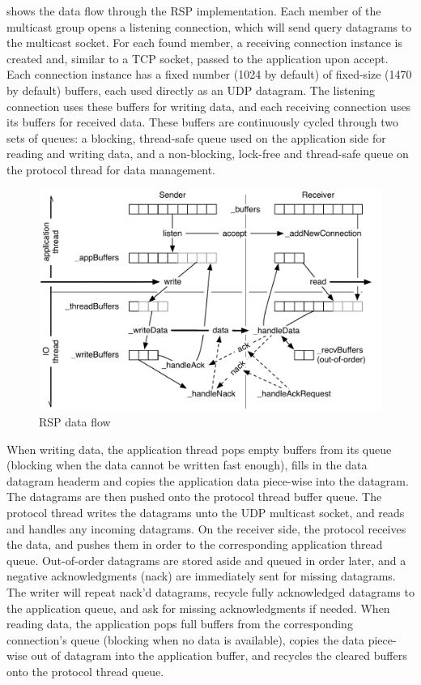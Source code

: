  shows the data flow through the RSP implementation. Each member of the multicast group opens a listening connection, which will send query datagrams to the multicast socket. For each found member, a receiving connection instance is created and, similar to a TCP socket, passed to the application upon \textsf{accept}. Each connection instance has a fixed number (1024 by default) of fixed-size (1470 by default) buffers, each used directly as an UDP datagram. The listening connection uses these buffers for writing data, and each receiving connection uses its buffers for received data. These buffers are continuously cycled through two sets of queues: a blocking, thread-safe queue used on the application side for reading and writing data, and a non-blocking, lock-free and thread-safe queue on the protocol thread for data management.

\begin{figure}[h!t]\center
  \includegraphics[width=\textwidth]{images/rspPackets.pdf}
  {\caption{\label{fRSP}RSP data flow}}
\end{figure}

When writing data, the application thread pops empty buffers from its queue
(blocking when the data cannot be written fast enough), fills in the
\textsf{data} datagram headerm and copies the application data piece-wise into
the datagram. The datagrams are then pushed onto the protocol thread buffer
queue. The protocol thread writes the datagrams unto the UDP multicast socket,
and reads and handles any incoming datagrams. On the receiver side, the protocol
receives the data, and pushes them in order to the corresponding application
thread queue. Out-of-order datagrams are stored aside and queued in order later,
and a negative acknowledgments (nack) are immediately sent for missing
datagrams. The writer will repeat nack'd datagrams, recycle fully acknowledged
datagrams to the application queue, and ask for missing acknowledgments if
needed. When reading data, the application pops full buffers from the
corresponding connection's queue (blocking when no data is available), copies
the data piece-wise out of datagram into the application buffer, and recycles
the cleared buffers onto the protocol thread queue.

